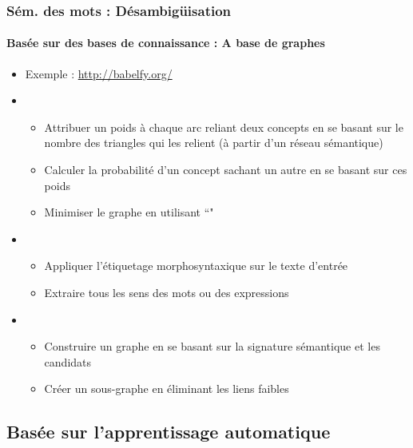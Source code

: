 \documentclass[xcolor=table]{beamer}
\begin{document}
\begin{frame}
\frametitle{Sém. des mots : Désambigüisation}
\framesubtitle{Basée sur des bases de connaissance : A base de graphes}
	
\begin{itemize}
	\item Exemple : \url{http://babelfy.org/} \cite{2014-moro-al}
	\item {}
	\begin{itemize}
		\item Attribuer un poids à chaque arc reliant deux concepts en se basant sur le nombre des triangles qui les relient (à partir d'un réseau sémantique)
		\item Calculer la probabilité d'un concept sachant un autre en se basant sur ces poids
		\item Minimiser le graphe en utilisant ``"
	\end{itemize}
	\item {}
	\begin{itemize}
		\item Appliquer l'étiquetage morphosyntaxique sur le texte d'entrée
		\item Extraire tous les sens des mots ou des expressions
	\end{itemize}
	\item {}
	\begin{itemize}
		\item Construire un graphe en se basant sur la signature sémantique et les candidats
		\item Créer un sous-graphe en éliminant les liens faibles
	\end{itemize}
\end{itemize}

\end{frame}

\subsection{Basée sur l'apprentissage automatique}
\end{document}

